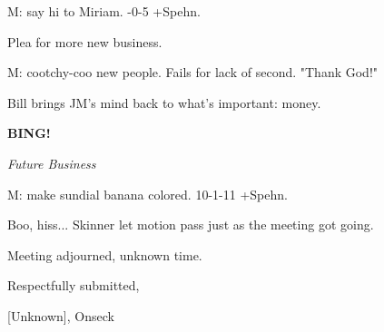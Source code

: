 \documentclass[12pt]{article}
\newcommand{\bing}{{\bf BING!} }
\newcommand{\goto}[1]{\bing \vskip 12pt \centerline{{\em{#1}}}}
\begin{document}
M: say hi to Miriam.  -0-5 +Spehn.

Plea for more new business.

M: cootchy-coo new people. Fails for lack of second. "Thank God!"

Bill brings JM's mind back to what's important: money.

\goto{Future Business}

M: make sundial banana colored. 10-1-11 +Spehn.

Boo, hiss... Skinner let motion pass just as the meeting got going.

\vspace{12pt}

\noindent
Meeting adjourned, unknown time.

\vspace{18pt}

\centerline{Respectfully submitted,}
\centerline{[Unknown], Onseck}
\end{document}
